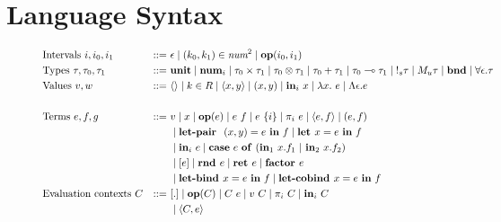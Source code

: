 \section{Language Syntax}

\begin{figure}[tbp]
  \begin{alignat*}{3}
         &\text{Intervals } i, i_0, i_1 &::=~ &\epsilon
         \mid (k_0, k_1) \in \textit{num}^{2}
         \mid \mathbf{op}(i_0, i_1) \\
         &\text{Types } \tau, \tau_0, \tau_1 &::=~ &\mathbf{unit}
         \mid \num_{i}
         \mid \tau_0 \times \tau_1
         \mid \tau_0 \otimes \tau_1
         \mid \tau_0 + \tau_1
         \mid \tau_0 \multimap \tau_1
         \mid {\bang{s} \tau}
         \mid {M_u \tau}
         \mid \textbf{bnd}
         \mid \forall \epsilon . \tau
         \\
         &\text{Values } v, w \ &::=~ &\langle \rangle
         \mid k \in R
         \mid \langle x,y \rangle 
         \mid (x, y)
         \mid \tin_i \ x
         \mid \lambda x.~e
         \mid \Lambda \epsilon . e \\
         \\
         &\text{Terms } e, f, g &::=~ &v
         \mid x
         \mid \mathbf{op}(e)
         \mid e~f
         \mid e~\{i\}
         \mid {\pi}_i\ e
         \mid \langle e,f \rangle 
         \mid (e, f) \\
         & & & \mid \letpair \ (x,y) = e \ \tin \ f
         \mid \letassign x  = e \ \tin \ f \\
         & & & \mid \tin_i \ e
         \mid 
          \mathbf{case} \ e \ \mathbf{of} \ (\tin_1 \ x.f_1 \ | \ \tin_2 \ x.f_2) \\
         & & &
         \mid [e]
         \mid \rnd e
         \mid {\ret e} 
         \mid \factor e \\
         & & & 
         \mid {\letbind x = e \ \tin \ f}
         \mid \letcobind x = e \ \tin \ f
         \\
         &\text{Evaluation contexts } C &::=~ &[.] 
         \mid \mathbf{op}(C) 
         \mid C~e 
         \mid v~C 
         \mid \pi_i~C 
         \mid \mathbf{in}_i~C \\
         & & &
         \mid \langle C, e \rangle

\end{alignat*}
\end{figure}
